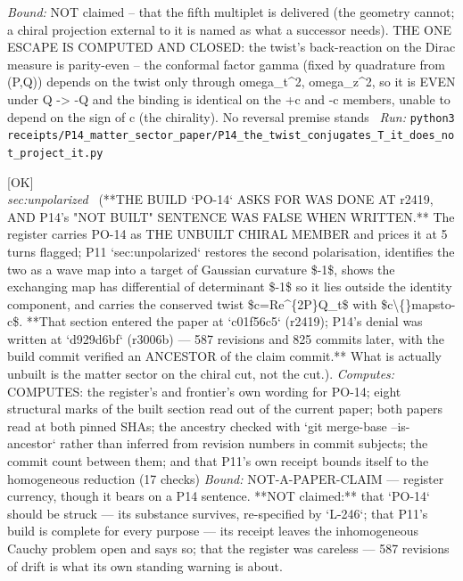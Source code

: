 \begin{description}
 \emph{Bound:} NOT claimed -- that the fifth multiplet is delivered (the geometry cannot; a chiral projection external to it is named as what a successor needs). THE ONE ESCAPE IS COMPUTED AND CLOSED: the twist's back-reaction on the Dirac measure is parity-even -- the conformal factor gamma (fixed by quadrature from (P,Q)) depends on the twist only through omega\_t\textasciicircum{}2, omega\_z\textasciicircum{}2, so it is EVEN under Q -> -Q and the binding is identical on the +c and -c members, unable to depend on the sign of c (the chirality). No reversal premise stands
\ \emph{Run:} \texttt{python3 receipts/P14\_matter\_sector\_paper/P14\_the\_twist\_conjugates\_T\_it\_does\_not\_project\_it.py}
\item[\label{rcpt:B1_the_geometry_po14_asks_for_was_built_at_r2419}\texttt{B1\_the\_geometry\_po14\_asks\_for\_was\_built\_at\_r2419}]\hfill\textsf{[OK]}\\
\textit{sec:unpolarized} \ (**THE BUILD `PO-14` ASKS FOR WAS DONE AT r2419, AND P14's "NOT BUILT" SENTENCE WAS FALSE WHEN WRITTEN.** The register carries PO-14 as THE UNBUILT CHIRAL MEMBER and prices it at 5 turns flagged; P11 `sec:unpolarized` restores the second polarisation, identifies the two as a wave map into a target of Gaussian curvature \$-1\$, shows the exchanging map has differential of determinant \$-1\$ so it lies outside the identity component, and carries the conserved twist \$c=Re\textasciicircum{}\{2P\}Q\_t\$ with \$c\textbackslash\{\}mapsto-c\$. **That section entered the paper at `c01f56c5` (r2419); P14's denial was written at `d929d6bf` (r3006b) --- 587 revisions and 825 commits later, with the build commit verified an ANCESTOR of the claim commit.** What is actually unbuilt is the matter sector on the chiral cut, not the cut.). 
\emph{Computes:} COMPUTES: the register's and frontier's own wording for PO-14; eight structural marks of the built section read out of the current paper; both papers read at both pinned SHAs; the ancestry checked with `git merge-base --is-ancestor` rather than inferred from revision numbers in commit subjects; the commit count between them; and that P11's own receipt bounds itself to the homogeneous reduction (17 checks)
 \emph{Bound:} NOT-A-PAPER-CLAIM --- register currency, though it bears on a P14 sentence. **NOT claimed:** that `PO-14` should be struck --- its substance survives, re-specified by `L-246`; that P11's build is complete for every purpose --- its receipt leaves the inhomogeneous Cauchy problem open and says so; that the register was careless --- 587 revisions of drift is what its own standing warning is about.

\end{description}
